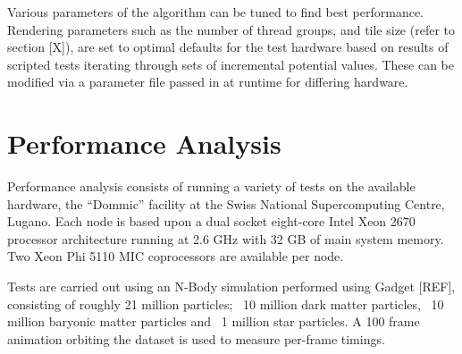 \documentclass[runningheads,a4paper]{llncs}
\begin{document}
Various parameters of the algorithm can be tuned to find best performance. Rendering parameters such as the number of 
thread groups, and tile size (refer to section [X]), are set to optimal defaults for the test hardware based on results 
of scripted tests iterating through sets of incremental potential values. These can be modified via a parameter file 
passed in at runtime for differing hardware.



\section{Performance Analysis}
\label{sect:performance}

Performance analysis consists of running a variety of tests on the available hardware, the “Dommic” facility at the 
Swiss National Supercomputing Centre, Lugano. Each node is based upon  a dual socket eight-core Intel Xeon 2670 
processor architecture running at 2.6 GHz with 32 GB of main system memory. Two Xeon Phi 5110 MIC coprocessors are 
available per node. 

Tests are carried out using an N-Body simulation performed using Gadget [REF], consisting of roughly 21 million 
particles;  ~10 million dark matter particles, ~10 million baryonic matter particles and ~1 million star particles. 
A 100 frame animation orbiting the dataset is used to measure per-frame timings.
\end{document}
